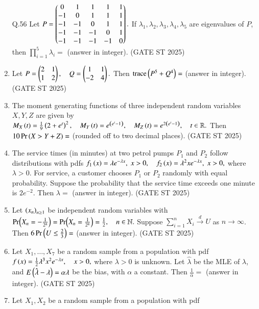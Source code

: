 \documentclass[journal,12pt,onecolumn]{IEEEtran}
\theoremstyle{remark}
\begin{document}
\begin{enumerate}
\item[Q.56] Let  
$
P=\begin{pmatrix}
0 & 1 & 1 & 1 & 1 \\
-1 & 0 & 1 & 1 & 1 \\
-1 & -1 & 0 & 1 & 1 \\
-1 & -1 & -1 & 0 & 1 \\
-1 & -1 & -1 & -1 & 0
\end{pmatrix}.
$
If $\lambda_1,\lambda_2,\lambda_3,\lambda_4,\lambda_5$ are eigenvalues of $P$, then $\prod_{i=1}^5 \lambda_i =$ \underline{\phantom{imagine}} (answer in integer).
\hfill{(GATE ST 2025)}
\item Let  
$
P=\begin{pmatrix}2 & 1 \\ 1 & 2\end{pmatrix}, 
\quad 
Q=\begin{pmatrix}1 & 1 \\ -2 & 4\end{pmatrix}.
$
Then $\text{trace}\left(P^5+Q^4\right)=$ \underline{\phantom{imagine}} (answer in integer).
\hfill{(GATE ST 2025)}
\item The moment generating functions of three independent random variables $X,Y,Z$ are given by
$
M_X\left(t\right)=\tfrac{1}{9}\left(2+e^t\right)^2, \quad
M_Y\left(t\right)=e^{\left(e^t-1\right)}, \quad
M_Z\left(t\right)=e^{2\left(e^t-1\right)}, \quad t\in\mathbb{R}.
$
Then $10\Pr\left(X>Y+Z\right)=$ \underline{\phantom{imagine}} (rounded off to two decimal places).
\hfill{(GATE ST 2025)}
\item The service times (in minutes) at two petrol pumps $P_1$ and $P_2$ follow distributions with pdfs
$
f_1\left(x\right)=\lambda e^{-\lambda x}, \; x>0,
\quad 
f_2\left(x\right)=\lambda^2 x e^{-\lambda x}, \; x>0,
$
where $\lambda>0$. For service, a customer chooses $P_1$ or $P_2$ randomly with equal probability. Suppose the probability that the service time exceeds one minute is $2e^{-2}$. Then $\lambda=$ \underline{\phantom{imagine}} (answer in integer).
\hfill{(GATE ST 2025)}
\item Let $\left(x_n\right)_{n\geq 1}$ be independent random variables with
$
\Pr\!\left(X_n=-\tfrac{1}{2^n}\right) = \Pr\!\left(X_n=\tfrac{1}{2^n}\right)=\tfrac{1}{2}, \quad n\in\mathbb{N}.
$
Suppose $\sum_{i=1}^n X_i \xrightarrow{d} U$ as $n\to\infty$. Then $6\Pr\left(U\leq \tfrac{2}{3}\right)=$ \underline{\phantom{imagine}} (answer in integer).
\hfill{(GATE ST 2025)}
\item Let $X_1,\dots,X_7$ be a random sample from a population with pdf
$
f\left(x\right)=\tfrac{1}{2}\lambda^3 x^2 e^{-\lambda x}, \quad x>0,
$
where $\lambda>0$ is unknown. Let $\hat{\lambda}$ be the MLE of $\lambda$, and $E\left(\hat{\lambda}-\lambda\right)=\alpha\lambda$ be the bias, with $\alpha$ a constant. Then $\tfrac{1}{\alpha}=$ \underline{\phantom{imagine}} (answer in integer).
\hfill{(GATE ST 2025)}
\item Let $X_1,X_2$ be a random sample from a population with pdf

\end{enumerate}
\end{document}
